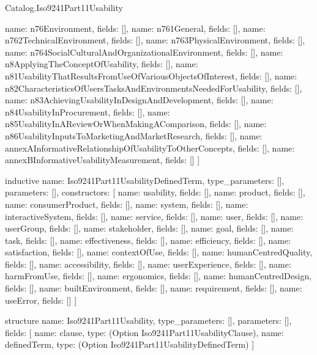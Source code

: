 \begin{lexlean}{Catalog.Iso9241Part11Usability}
\begin{semanticmodule}
{    {name: n76Environment, fields: []},
    {name: n761General, fields: []},
    {name: n762TechnicalEnvironment, fields: []},
    {name: n763PhysicalEnvironment, fields: []},
    {name: n764SocialCulturalAndOrganizationalEnvironment, fields: []},
    {name: n8ApplyingTheConceptOfUsability, fields: []},
    {name: n81UsabilityThatResultsFromUseOfVariousObjectsOfInterest, fields: []},
    {name: n82CharacteristicsOfUsersTasksAndEnvironmentsNeededForUsability, fields: []},
    {name: n83AchievingUsabilityInDesignAndDevelopment, fields: []},
    {name: n84UsabilityInProcurement, fields: []},
    {name: n85UsabilityInAReviewOrWhenMakingAComparison, fields: []},
    {name: n86UsabilityInputsToMarketingAndMarketResearch, fields: []},
    {name: annexAInformativeRelationshipOfUsabilityToOtherConcepts, fields: []},
    {name: annexBInformativeUsabilityMeasurement, fields: []}
  ]
}

inductive{
  name: Iso9241Part11UsabilityDefinedTerm,
  type_parameters: [],
  parameters: [],
  constructors: [
    {name: usability, fields: []},
    {name: product, fields: []},
    {name: consumerProduct, fields: []},
    {name: system, fields: []},
    {name: interactiveSystem, fields: []},
    {name: service, fields: []},
    {name: user, fields: []},
    {name: userGroup, fields: []},
    {name: stakeholder, fields: []},
    {name: goal, fields: []},
    {name: task, fields: []},
    {name: effectiveness, fields: []},
    {name: efficiency, fields: []},
    {name: satisfaction, fields: []},
    {name: contextOfUse, fields: []},
    {name: humanCentredQuality, fields: []},
    {name: accessibility, fields: []},
    {name: userExperience, fields: []},
    {name: harmFromUse, fields: []},
    {name: ergonomics, fields: []},
    {name: humanCentredDesign, fields: []},
    {name: builtEnvironment, fields: []},
    {name: requirement, fields: []},
    {name: useError, fields: []}
  ]
}

structure{
  name: Iso9241Part11Usability,
  type_parameters: [],
  parameters: [],
  fields: [
    {name: clause, type: (Option Iso9241Part11UsabilityClause)},
    {name: definedTerm, type: (Option Iso9241Part11UsabilityDefinedTerm)}
  ]
}
\end{semanticmodule}
\end{lexlean}
